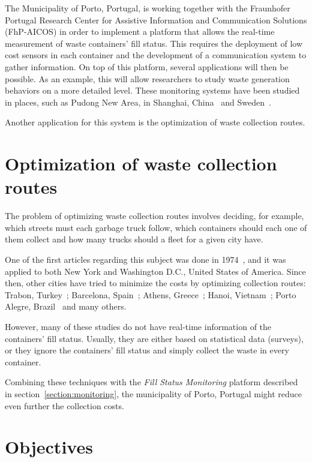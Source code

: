 The Municipality of Porto, Portugal, is working together with the Fraunhofer
Portugal Research Center for Assistive Information and Communication Solutions
(FhP-AICOS) in order to implement a platform that allows the real-time
measurement of waste containers' fill status. This requires the deployment of
low cost sensors in each container and the development of a communication
system to gather information. On top of this platform, several applications
will then be possible. As an example, this will allow researchers to study
waste generation behaviors on a more detailed level. These monitoring systems
have been studied in places, such as Pudong New Area, in Shanghai,
China~\citep{Rovetta09,Vicentini09} and Sweden~\citep{Johansson06}.

Another application for this system is the optimization of waste collection
routes.




\section{Optimization of waste collection routes}
\label{section:optimization}

The problem of optimizing waste collection routes involves deciding, for
example, which streets must each garbage truck follow, which containers should
each one of them collect and how many trucks should a fleet for a given city
have.

One of the first articles regarding this subject was done in
1974~\citep{Beltrami74}, and it was applied to both New York and Washington
D.C., United States of America. Since then, other cities have tried to minimize
the costs by optimizing collection routes: Trabon, Turkey~\citep{Apaydin2007};
Barcelona, Spain~\citep{Bautista2004}; Athens, Greece~\citep{Karadimas2005};
Hanoi, Vietnam~\citep{Tung2000}; Porto Alegre, Brazil~\citep{Li2008} and many
others.

However, many of these studies do not have real-time information of the
containers' fill status. Usually, they are either based on statistical data
(surveys), or they ignore the containers' fill status and simply collect the
waste in every container.

Combining these techniques with the \textit{Fill Status Monitoring} platform
described in section~\ref{section:monitoring}, the municipality of Porto,
Portugal might reduce even further the collection costs.




\section{Objectives}
\label{section:objectives}

